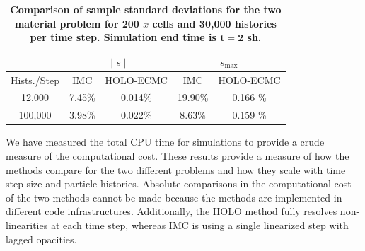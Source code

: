 \documentclass{mc2013}
\renewcommand{\ss}{\ensuremath{\|s\|}}
\begin{document}
\begin{table}[H]
\centering
\caption{\label{twomat_var} \textbf{Comparison of sample standard deviations for the
    two material problem for 200 $x$ cells and 30,000 histories per time step.   Simulation end time is $\mathbf{t=2}$ sh.}}
\vspace{-0.1in}
\begin{tabular}{|c|cc|cc|}\cline{2-5}
    \multicolumn{1}{c|}{}       & \multicolumn{2}{|c|}{\ss} & \multicolumn{2}{|c|}{$s_{\max}$} \\ \hline
Hists./Step     & IMC & HOLO-ECMC  &  IMC & HOLO-ECMC   \\ \hline
   12,000	    & 7.45\%  & 0.014\% &  19.90\%  & 0.166 \%            \\
  100,000       & 3.98\%  & 0.022\% &  8.63\%   & 0.159 \%     \\ \hline
\end{tabular}
\end{table}


We have measured the total CPU time for simulations to provide a crude measure of the
computational cost.  These results provide a measure of how the methods compare for
the two different problems and how they scale with
time step size and particle histories.  Absolute comparisons in the computational cost of the two
methods cannot be made because the methods are implemented
in different code infrastructures. Additionally, the HOLO method fully resolves
non-linearities at each time step, whereas IMC is using a single linearized step with
lagged opacities. 
\end{document}
